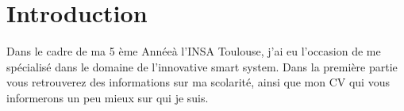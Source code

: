 \chapter{Introduction}

Dans le cadre de ma 5 ème Annéeà l'INSA Toulouse, j'ai eu l'occasion de me spécialisé dans le domaine de l'innovative smart system.
Dans la première partie vous retrouverez des informations sur ma scolarité, ainsi que mon CV qui vous informerons un peu mieux sur qui je suis.
